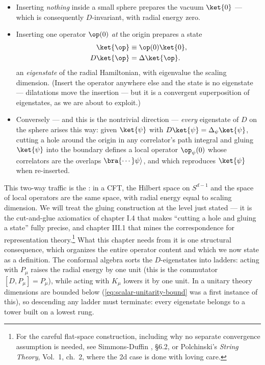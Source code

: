 \begin{itemize}
\item Inserting \emph{nothing} inside a small sphere prepares the vacuum
$\ket{0}$ --- which is consequently $D$-invariant, with radial energy zero.
\item Inserting one operator $\op(0)$ \emph{at} the origin prepares a state
\begin{equation}
\begin{aligned}
\ket{\op} &\equiv \op(0)\ket{0},\\
D\ket{\op} &= \Delta\ket{\op}.
\end{aligned}
\label{eq:state-operator}
\end{equation}
an \emph{eigenstate} of the radial Hamiltonian, with eigenvalue the scaling
dimension. (Insert the operator anywhere else and the state is no eigenstate
--- dilatations move the insertion --- but it is a convergent superposition
of eigenstates, as we are about to exploit.)
\item Conversely --- and this is the nontrivial direction --- \emph{every}
eigenstate of $D$ on the sphere arises this way: given $\ket{\psi}$ with
$D\ket{\psi} = \Delta_\psi \ket{\psi}$, cutting a hole around the origin in
any correlator's path integral and gluing $\ket{\psi}$ into the boundary
defines a local operator $\op_\psi(0)$ whose correlators are the overlaps
$\bra{\cdots}\psi\rangle$, and which reproduces $\ket{\psi}$ when re-inserted.
\end{itemize}

\noin This two-way traffic is the : in a
CFT, the Hilbert space on $S^{d-1}$ and the space of local operators are the
same space, with radial energy equal to scaling dimension. We will treat the
gluing construction at the level just stated --- it is the cut-and-glue
axiomatics of chapter I.4 that makes ``cutting a hole and gluing a state''
fully precise, and chapter III.1 that mines the correspondence for
representation theory.\footnote{For the careful flat-space construction,
including why no separate convergence assumption is needed, see
Simmons-Duffin , \S6.2, or Polchinski's \emph{String
Theory}, Vol.\ 1, ch.\ 2, where the 2d case is done with loving care.} What
this chapter needs from it is one structural consequence, which organizes
the entire operator content and which we now state as a definition. The
conformal algebra sorts the $D$-eigenstates into ladders: acting with
$P_\mu$ raises the radial energy by one unit (this is the commutator $[D,
P_\mu] = P_\mu$), while acting with $K_\mu$ lowers it by one unit. In a
unitary theory dimensions are bounded below
(\eqref{eq:scalar-unitarity-bound} was a first instance of this), so
descending any ladder must terminate: every eigenstate belongs to a tower
built on a lowest rung.

